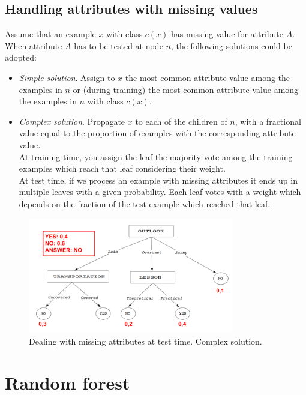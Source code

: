 \subsection{Handling attributes with missing values}
Assume that an example $x$ with class $c(x)$ has missing value for attribute $A$. When attribute $A$ has to be tested at node $n$, the following solutions could be adopted:
\begin{itemize}
    \item \textit{Simple solution}. Assign to $x$ the most common attribute value among the examples in $n$ or (during training) the most common attribute value among the examples in $n$ with class $c(x)$.
    \item \textit{Complex solution}. Propagate $x$ to each of the children of $n$, with a fractional value equal to the proportion of examples with the corresponding attribute value.\\At training time, you assign the leaf the majority vote among the training examples which reach that leaf considering their weight.\\At test time, if we process an example with missing attributes it ends up in multiple leaves with a given probability. Each leaf votes with a weight which depends on the fraction of the test example which reached that leaf.
\end{itemize}

\begin{figure}
    \centering
    \includegraphics[width=0.8\textwidth]{images/missingAttributes.png}
    \caption{Dealing with missing attributes at test time. Complex solution.}
    \label{missing_attributes}
\end{figure}

\section{Random forest}

